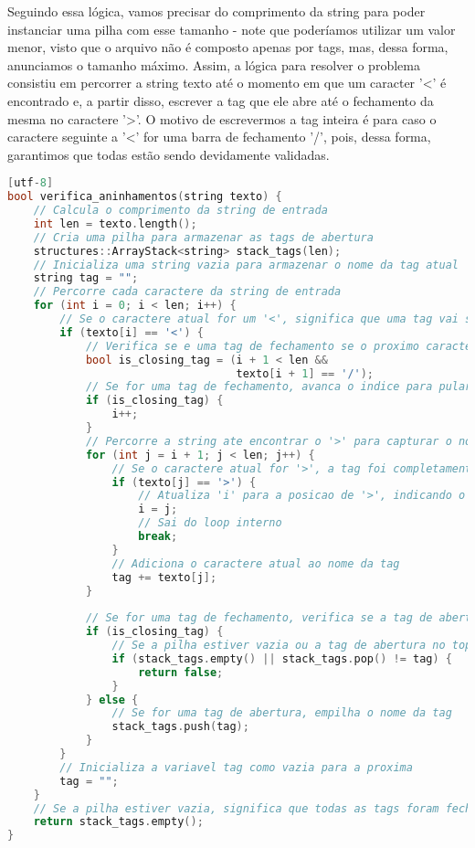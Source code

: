 Seguindo essa lógica, vamos precisar do comprimento da string para poder instanciar uma pilha com esse tamanho - note que poderíamos utilizar um valor menor, visto que o arquivo não é composto apenas por tags, mas, dessa forma, anunciamos o tamanho máximo. Assim, a lógica para resolver o problema consistiu em percorrer a string texto até o momento em que um caracter '<' é encontrado e, a partir disso, escrever a tag que ele abre até o fechamento da mesma no caractere '>'. O motivo de escrevermos a tag inteira é para caso o caractere seguinte a '<' for uma barra de fechamento '/', pois, dessa forma, garantimos que todas estão sendo devidamente validadas.
\begin{lstlisting}[language=c++][utf-8]
bool verifica_aninhamentos(string texto) {
    // Calcula o comprimento da string de entrada
    int len = texto.length();
    // Cria uma pilha para armazenar as tags de abertura
    structures::ArrayStack<string> stack_tags(len);
    // Inicializa uma string vazia para armazenar o nome da tag atual
    string tag = "";
    // Percorre cada caractere da string de entrada
    for (int i = 0; i < len; i++) {
        // Se o caractere atual for um '<', significa que uma tag vai ser escrita
        if (texto[i] == '<') {
            // Verifica se e uma tag de fechamento se o proximo caractere for '/'
            bool is_closing_tag = (i + 1 < len &&
                                   texto[i + 1] == '/');
            // Se for uma tag de fechamento, avanca o indice para pular o '/'
            if (is_closing_tag) {
                i++;
            }
            // Percorre a string ate encontrar o '>' para capturar o nome da tag
            for (int j = i + 1; j < len; j++) {
                // Se o caractere atual for '>', a tag foi completamente capturada
                if (texto[j] == '>') {
                    // Atualiza 'i' para a posicao de '>', indicando o fim da tag
                    i = j;
                    // Sai do loop interno
                    break;
                }
                // Adiciona o caractere atual ao nome da tag
                tag += texto[j];
            }
            
            // Se for uma tag de fechamento, verifica se a tag de abertura esta no topo da pilha
            if (is_closing_tag) {
                // Se a pilha estiver vazia ou a tag de abertura no topo da pilha nao corresponder a tag de fechamento, retorna falso
                if (stack_tags.empty() || stack_tags.pop() != tag) {
                    return false;
                }
            } else {
                // Se for uma tag de abertura, empilha o nome da tag
                stack_tags.push(tag);
            }
        }
        // Inicializa a variavel tag como vazia para a proxima
        tag = "";
    }
    // Se a pilha estiver vazia, significa que todas as tags foram fechadas
    return stack_tags.empty();
}
\end{lstlisting}

